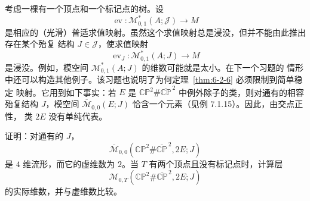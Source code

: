 考虑一棵有一个顶点和一个标记点的树。设
\[
  \operatorname{ev}:\mathcal M^*_{0,1}(A;\mathcal J)\longrightarrow M
\]
是相应的（光滑）普适求值映射。虽然这个求值映射总是浸没，但并不能由此推出存在某个殆复
结构 $J\in\mathcal J$，使求值映射
\[
  \operatorname{ev}_J:\mathcal M^*_{0,1}(A;J)\longrightarrow M
\]
是浸没。例如，模空间 $\mathcal M^*_{0,1}(A;J)$ 的维数可能就是太小。在下一个习题的
情形中还可以构造其他例子。该习题也说明了为何定理~\ref{thm:6-2-6} 必须限制到简单稳定
映射。它用到如下事实：若 $E$ 是
$\mathbb{CP}^2\#\overline{\mathbb{CP}}^{\,2}$ 中例外除子的类，则对通有的相容殆复结构
$J$，模空间
$\overline{\mathcal M}_{0,0}(E;J)$ 恰含一个元素（见例 7.1.15）。因此，由交点正性，
类 $2E$ 没有单纯代表。

\begin{exercise}\label{ex:6-3-3}
证明：对通有的 $J$，
\[
  \overline{\mathcal M}_{0,0}
  (\mathbb{CP}^2\#\overline{\mathbb{CP}}^{\,2},2E;J)
\]
是 $4$ 维流形，而它的虚维数为 $2$。当 $T$ 有两个顶点且没有标记点时，计算层
\[
  \mathcal M_{0,T}
  (\mathbb{CP}^2\#\overline{\mathbb{CP}}^{\,2},2E;J)
\]
的实际维数，并与虚维数比较。
\end{exercise}
